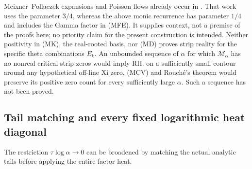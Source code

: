 \documentclass[11pt]{article}
\theoremstyle{remark}\newtheorem{remark}[theorem]{Remark}
\begin{document}
Meixner--Pollaczek expansions and Poisson flows already occur in
\cite[\S3.4, Theorems 3.6--3.8 and Proposition 3.9]{Romik2019}.
That work uses the parameter $3/4$, whereas the above monic recurrence
has parameter $1/4$ and includes the Gamma factor in (MFE).
It supplies context, not a premise of the proofs here; no priority claim for the present construction is intended.
Neither positivity in (MK), the real-rooted basis, nor (MD) proves
strip reality for the specific theta combinations $E_k$.
An unbounded sequence of $\alpha$ for which $\mathcal M_\alpha$ has
no nonreal critical-strip zeros would imply RH: on a sufficiently
small contour around any hypothetical off-line Xi zero, (MCV) and
Rouch\'e's theorem would preserve its positive zero count for every
sufficiently large $\alpha$. Such a sequence has not been proved.

\subsection{Tail matching and every fixed logarithmic heat diagonal}
The restriction $\tau\log\alpha\to0$ can be broadened by matching
the actual analytic tails before applying the entire-factor heat.
\end{document}
